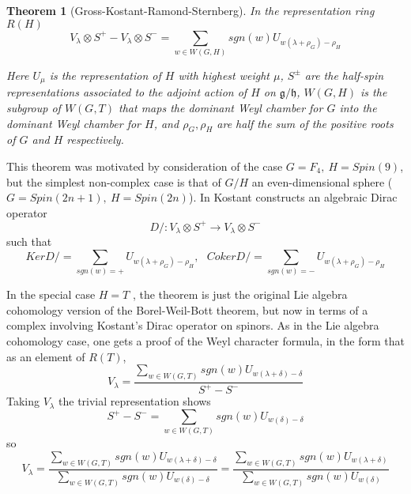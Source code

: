 \documentclass[a4paper,a4paper]{article}
\newtheorem{theorem}{Theorem}
\theoremstyle{conjecture}
\def\Slash#1{#1\!\!\!\!/}
\def\Dirac{\Slash D}
\begin{document}
\begin{theorem}[Gross-Kostant-Ramond-Sternberg]
In the representation ring $R(H)$
$$V_\lambda \otimes S^+ -V_\lambda \otimes S^- = \sum _{w\in W(G,H)} sgn(w)U_{w(\lambda+\rho_G)-\rho_H}$$

Here $U_{\mu}$ is the representation of $H$ with highest weight $\mu$,
$S^{\pm}$ are the half-spin representations associated to the adjoint
action of $H$ on $\mathfrak g/\mathfrak h$, $W(G,H)$ is
the subgroup of $W(G,T)$ that maps the dominant Weyl chamber for $G$ into the
dominant Weyl chamber for $H$, and $\rho_{G},\rho_{H}$ are half the sum of the
positive roots of $G$ and $H$ respectively.
\end{theorem}

This theorem was motivated by consideration of the case $G=F_4,\ H=Spin(9)$,
but the simplest non-complex case is that of $G/H$ an even-dimensional
sphere ($G=Spin(2n+1),\ H=Spin(2n)$). In \cite{Kostant2} Kostant constructs an algebraic
Dirac operator
$$\Dirac :V_\lambda \otimes S^+\rightarrow V_\lambda \otimes S^-$$
such that
$$ Ker \Dirac =\sum_{sgn(w)=+}U_{w(\lambda+\rho_G)-\rho_H}, \ \ \
Coker \Dirac =\sum_{sgn(w)=-}U_{w(\lambda+\rho_G)-\rho_H}$$

In the special case $H=T$ \cite{Kostant3}, the theorem is just the original Lie algebra
cohomology version of the Borel-Weil-Bott theorem, but now in terms of
a complex involving Kostant's Dirac operator on spinors. As in the Lie algebra cohomology
case, one gets a proof of the Weyl character formula, in the form that as an element of $R(T)$,
$$V_\lambda=\frac{\sum _{w\in W(G,T)} sgn(w)U_{w(\lambda+\delta)-\delta}}{S^+ -S^-}$$
Taking $V_\lambda$ the trivial representation shows
$$ S^+ -S^-=\sum _{w\in W(G,T)} sgn(w)U_{w(\delta)-\delta}$$
so
$$V_\lambda=\frac{\sum _{w\in W(G,T)} sgn(w)U_{w(\lambda+\delta)-\delta}}{\sum _{w\in W(G,T)} sgn(w)U_{w(\delta)-\delta}}=
\frac{\sum _{w\in W(G,T)} sgn(w)U_{w(\lambda+\delta)}}{\sum _{w\in W(G,T)} sgn(w)U_{w(\delta)}}$$
\end{document}
